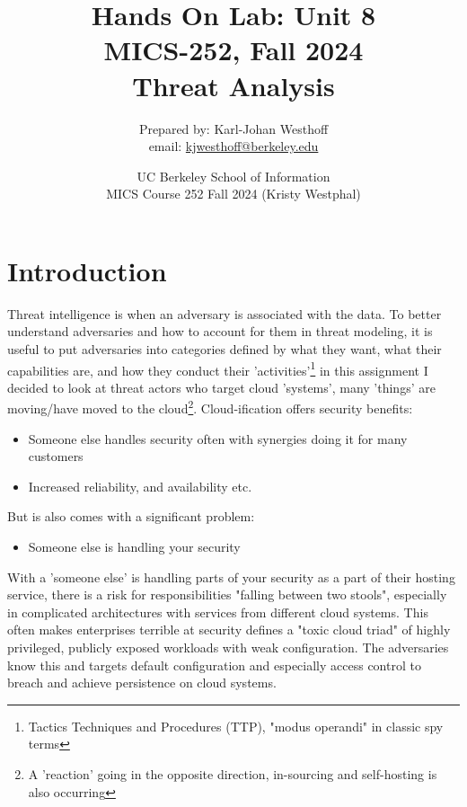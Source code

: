 \documentclass[
	letterpaper, %
	10pt, %
	unnumberedsections, %
	twoside, %
]{APAAssignment}
\title{Hands On Lab: Unit 8 \\ MICS-252, Fall 2024 \\ Threat Analysis} %
\date{UC Berkeley School of Information \\
MICS Course 252 Fall 2024 (Kristy Westphal)
}
\author{
	Prepared by: Karl-Johan Westhoff \\
	email: \href{mailto:kjwesthoff@berkeley.edu}{kjwesthoff@berkeley.edu}
}
\begin{document}
\onecolumn
\maketitle %



\section{Introduction}
Threat intelligence is when an adversary is associated with the data. To better understand adversaries and how to account for them in threat modeling, it is useful to put adversaries into categories defined by what they want, what their capabilities are, and how they conduct their 'activities'\footnote{Tactics Techniques and Procedures (TTP), "modus operandi" in classic spy terms} in this assignment I decided to look at threat actors who target cloud 'systems', many 'things' are moving/have moved to the cloud\footnote{A 'reaction' going in the opposite direction, in-sourcing and self-hosting is also occurring\cite{DHH_leftTheCloud}}. Cloud-ification offers security benefits:
\begin{itemize}
	\item Someone else handles security often with synergies doing it for many customers
	\item Increased reliability, and availability etc.
\end{itemize}

But is also comes with a significant problem:
\begin{itemize}
	\item Someone else is handling your security
\end{itemize}

With a 'someone else' is handling parts of your security as a part of their hosting service, there is a risk for responsibilities "falling between two stools", especially in complicated architectures with services from different cloud systems. This often makes enterprises terrible at security \cite{CloudComputingInsider} defines a "toxic cloud triad" of highly privileged, publicly exposed workloads with weak configuration. The adversaries know this and targets default configuration and especially access control to breach and achieve persistence on cloud systems.
\end{document}
